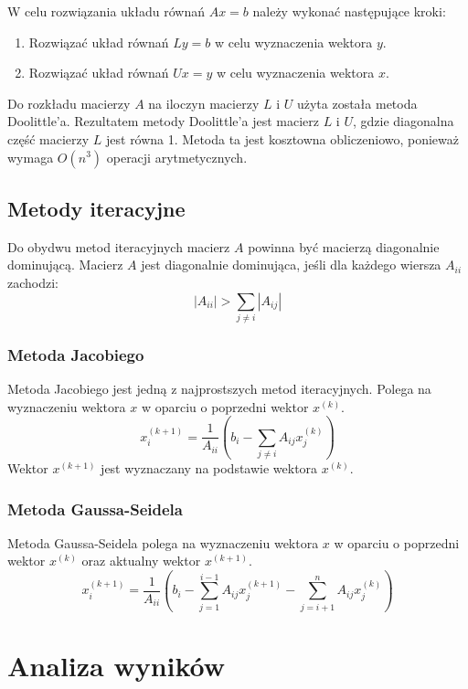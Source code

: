 \documentclass[a4paper,12pt]{article}  %
\begin{document}
W celu rozwiązania układu równań $Ax = b$ należy wykonać następujące kroki:
\begin{enumerate}
    \item Rozwiązać układ równań $Ly = b$ w celu wyznaczenia wektora $y$.
    \item Rozwiązać układ równań $Ux = y$ w celu wyznaczenia wektora $x$.
\end{enumerate}
Do rozkładu macierzy $A$ na iloczyn macierzy $L$ i $U$ użyta została
metoda Doolittle'a. Rezultatem metody Doolittle'a jest macierz $L$ i $U$,
gdzie diagonalna część macierzy $L$ jest równa 1. Metoda ta jest kosztowna
obliczeniowo, ponieważ wymaga $O(n^3)$ operacji arytmetycznych.
\subsection{Metody iteracyjne}
Do obydwu metod iteracyjnych macierz $A$ powinna być macierzą
diagonalnie dominującą.
Macierz $A$ jest diagonalnie dominująca, jeśli dla każdego wiersza
$A_{ii}$ zachodzi:
\begin{equation}
    |A_{ii}| > \sum_{j \neq i} |A_{ij}|
\end{equation}

\subsubsection{Metoda Jacobiego}
Metoda Jacobiego jest jedną z najprostszych metod iteracyjnych. Polega na
wyznaczeniu wektora $x$ w oparciu o poprzedni wektor $x^{(k)}$.
\begin{equation}
    x^{(k+1)}_i = \frac{1}{A_{ii}} \left( b_i - \sum_{j \neq i} A_{ij} x^{(k)}_j \right)
\end{equation}
Wektor $x^{(k+1)}$ jest wyznaczany na podstawie wektora $x^{(k)}$.

\subsubsection{Metoda Gaussa-Seidela}
Metoda Gaussa-Seidela polega na wyznaczeniu wektora $x$ w oparciu o
poprzedni wektor $x^{(k)}$ oraz aktualny wektor $x^{(k+1)}$.
\begin{equation}
  x^{(k+1)}_i = \frac{1}{A_{ii}} \left( b_i - \sum_{j = 1}^{i-1} A_{ij}
  x^{(k+1)}_j - \sum_{j = i+1}^{n} A_{ij} x^{(k)}_j \right)
\end{equation}

\section{Analiza wyników}
\end{document}
